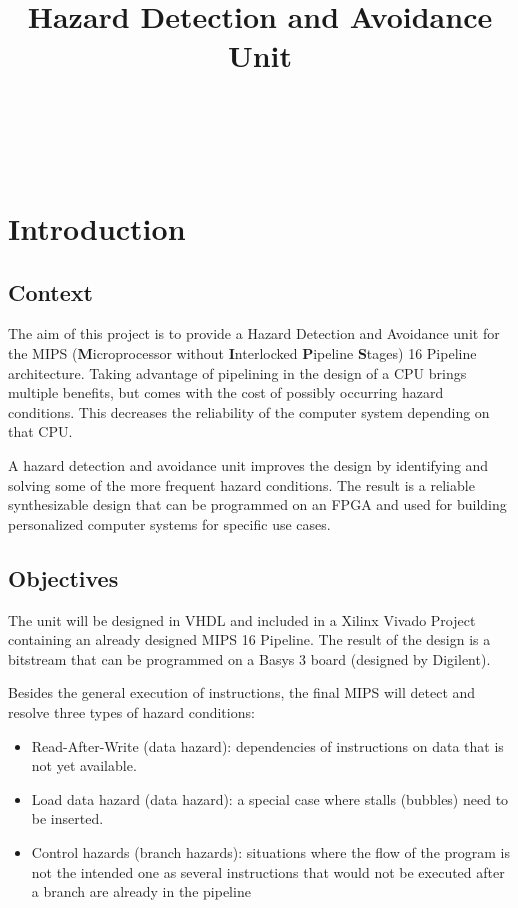 \documentclass[a4paper,12pt]{report}
\title{\textbf{Hazard Detection and Avoidance Unit}}
\author{
    \IEEEauthorblockN{student: Radu-Augustin Vele} \\\\
    \hline\\
    \IEEEauthorblockA{{Structure of Computer Systems Project} \\ \\
    \hline \\
    {$3^{rd}$ year student} \\
    {Technical University of Cluj-Napoca}}}
\begin{document}
\maketitle

\newpage

\tableofcontents


\newpage


\chapter{Introduction}
\section{Context} 

The aim of this project is to provide a Hazard Detection and Avoidance unit for the MIPS (\textbf{M}icroprocessor without \textbf{I}nterlocked \textbf{P}ipeline \textbf{S}tages) 16 Pipeline architecture. Taking advantage of pipelining in the design of a CPU brings multiple benefits, but comes with the cost of possibly occurring hazard conditions. This decreases the reliability of the computer system depending on that CPU.


A hazard detection and avoidance unit improves the design by identifying and solving some of the more frequent hazard conditions. The result is a reliable synthesizable design that can be programmed on an FPGA and used for building personalized computer systems for specific use cases.
 
\section{Objectives}

The unit will be designed in VHDL and included in a Xilinx Vivado Project containing an already designed MIPS 16 Pipeline. The result of the design is a bitstream that can be programmed on a Basys 3 board (designed by Digilent). 

Besides the general execution of instructions, the final MIPS will detect and resolve three types of hazard conditions:

\begin{itemize}
    \item Read-After-Write (data hazard): dependencies of instructions on data that is not yet available.
    \item Load data hazard (data hazard): a special case where stalls (bubbles) need to be inserted.
    \item Control hazards (branch hazards): situations where the flow of the program is not the intended one as several instructions that would not be executed after a branch are already in the pipeline
\end{itemize}
\end{document}
